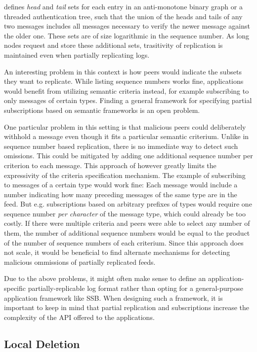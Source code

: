 \documentclass[sigconf]{acmart}
\begin{document}
\cite{lipmaa1999secure} defines {\em head} and {\em tail} sets for each entry in an anti-monotone binary graph or a threaded authentication tree, such that the union of the heads and tails of any two messages includes all messages necessary to verify the newer message against the older one. These sets are of size logarithmic in the sequence number. As long nodes request and store these additional sets, trasitivity of replication is maintained even when partially replicating logs.

An interesting problem in this context is how peers would indicate the subsets they want to replicate. While listing sequence numbers works fine, applications would benefit from utilizing semantic criteria instead, for example subscribing to only messages of certain types. Finding a general framework for specifying partial subscriptions based on semantic frameworks is an open problem.

One particular problem in this setting is that malicious peers could deliberately withhold a message even though it fits a particular semantic criterium. Unlike in sequence number based replication, there is no immediate way to detect such omissions. This could be mitigated by adding one additional sequence number per criterion to each message. This approach of however greatly limits the expressivity of the criteria specification mechanism. The example of subscribing to messages of a certain type would work fine: Each message would include a number indicating how many preceding messages of the same type are in the feed. But e.g. subscriptions based on arbitrary prefixes of types would require one sequence number {\em per character} of the message type, which could already be too costly. If there were multiple criteria and peers were able to select any number of them, the number of additional sequence numbers would be equal to the product of the number of sequence numbers of each criterium. Since this approach does not scale, it would be beneficial to find alternate mechanisms for detecting malicious ommissions of partially replicated feeds.

Due to the above problems, it might often make sense to define an application-specific partially-replicable log format rather than opting for a general-purpose application framework like SSB. When designing such a framework, it is important to keep in mind that partial replication and subscriptions increase the complexity of the API offered to the applications.

\subsection{Local Deletion}
\end{document}
